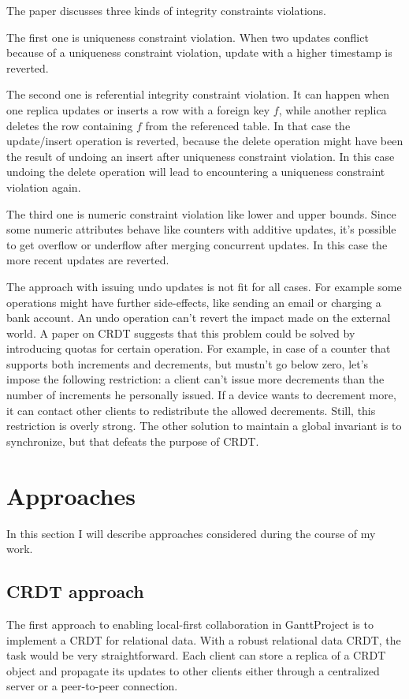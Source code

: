 \documentclass[a4paper, 11pt, oneside]{article}
\theoremstyle{definition}
\begin{document}
The paper discusses three kinds of integrity constraints violations. 

The first one is uniqueness constraint violation. When two updates conflict because of a uniqueness constraint violation, update with a higher timestamp is reverted. 

The second one is referential integrity constraint violation. It can happen when one replica updates or inserts a row with a foreign key $f$, while another replica deletes the row containing $f$ from the referenced table. In that case the update/insert operation is reverted, because the delete operation might have been the result of undoing an insert after uniqueness constraint violation. In this case undoing the delete operation will lead to encountering a uniqueness constraint violation again.

The third one is numeric constraint violation like lower and upper bounds. Since some numeric attributes behave like counters with additive updates, it's possible to get overflow or underflow after merging concurrent updates. In this case the more recent updates are reverted.

The approach with issuing undo updates is not fit for all cases. For example some operations might have further side-effects, like sending an email or charging a bank account.  An undo operation can't revert the impact made on the external world. A paper on CRDT \cite{crdt} suggests that this problem could be solved by introducing quotas for certain operation. For example, in case of a counter that supports both increments and decrements, but mustn't go below zero, let's impose the following restriction: a client can't issue more decrements than the number of increments he personally issued. If a device wants to decrement more, it can contact other clients to redistribute the allowed decrements. Still, this restriction is overly strong. The other solution to maintain a global invariant is to synchronize, but that defeats the purpose of CRDT.

\section{Approaches}
In this section I will describe approaches considered during the course of my work.

\subsection{CRDT approach}
The first approach to enabling local-first collaboration in GanttProject is to implement a CRDT for relational data. With a robust relational data CRDT, the task would be very straightforward. Each client can store a replica of a CRDT object and propagate its updates to other clients either through a centralized server or a peer-to-peer connection.
\end{document}
